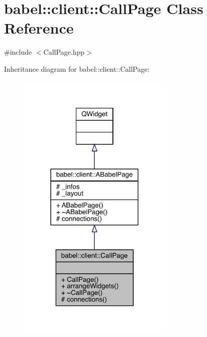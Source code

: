 \hypertarget{classbabel_1_1client_1_1_call_page}{}\section{babel\+:\+:client\+:\+:Call\+Page Class Reference}
\label{classbabel_1_1client_1_1_call_page}


{\ttfamily \#include $<$Call\+Page.\+hpp$>$}



Inheritance diagram for babel\+:\+:client\+:\+:Call\+Page\+:\nopagebreak
\begin{figure}[H]
\begin{center}
\leavevmode
\includegraphics[width=211pt]{classbabel_1_1client_1_1_call_page__inherit__graph}
\end{center}
\end{figure}


